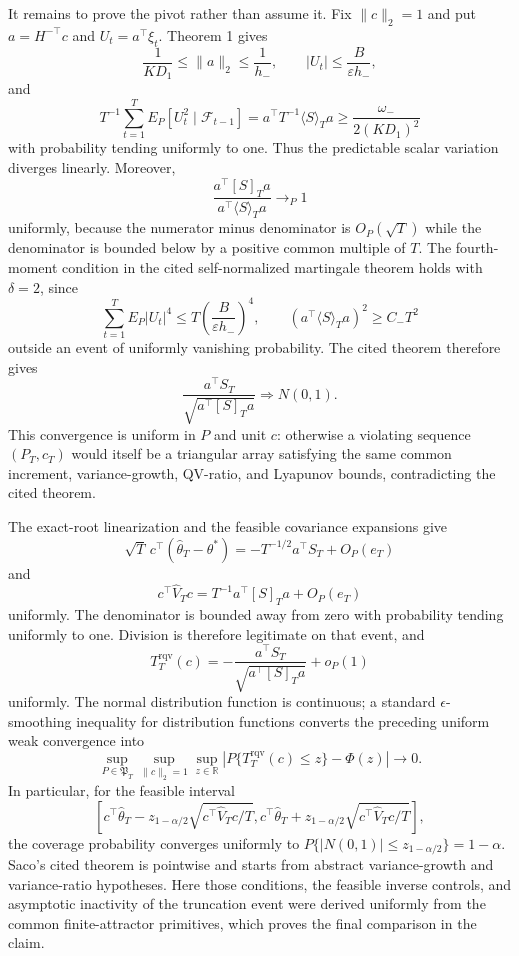 It remains to prove the pivot rather than assume it. Fix \(\|c\|_2=1\) and put \(a=H^{-\top}c\) and \(U_t=a^\top\xi_t\). Theorem 1 gives
\[
 \frac1{KD_1}\le\|a\|_2\le\frac1{h_-},\qquad
 |U_t|\le\frac{B}{\varepsilon h_-},
\]
and
\[
 T^{-1}\sum_{t=1}^TE_P[U_t^2\mid\mathcal F_{t-1}]
 =a^\top T^{-1}\langle S\rangle_Ta
 \ge \frac{\omega_-}{2(KD_1)^2}
\]
with probability tending uniformly to one. Thus the predictable scalar variation diverges linearly. Moreover,
\[
 \frac{a^\top[S]_Ta}{a^\top\langle S\rangle_Ta}\to_P1
\]
uniformly, because the numerator minus denominator is \(O_P(\sqrt T)\) while the denominator is bounded below by a positive common multiple of \(T\). The fourth-moment condition in the cited self-normalized martingale theorem holds with \(\delta=2\), since
\[
 \sum_{t=1}^TE_P|U_t|^4\le T\left(\frac{B}{\varepsilon h_-}\right)^4,
 \qquad
 \left(a^\top\langle S\rangle_Ta\right)^2\ge C_-T^2
\]
outside an event of uniformly vanishing probability. The cited theorem therefore gives
\[
 \frac{a^\top S_T}{\sqrt{a^\top[S]_Ta}}\Rightarrow N(0,1).
\]
This convergence is uniform in \(P\) and unit \(c\): otherwise a violating sequence \((P_T,c_T)\) would itself be a triangular array satisfying the same common increment, variance-growth, QV-ratio, and Lyapunov bounds, contradicting the cited theorem.

The exact-root linearization and the feasible covariance expansions give
\[
 \sqrt T\,c^\top(\widehat\theta_T-\theta^*)
 =-T^{-1/2}a^\top S_T+O_P(e_T)
\]
and
\[
 c^\top\widehat V_Tc
 =T^{-1}a^\top[S]_Ta+O_P(e_T)
\]
uniformly. The denominator is bounded away from zero with probability tending uniformly to one. Division is therefore legitimate on that event, and
\[
 T_T^{\mathrm{rqv}}(c)
 =-\frac{a^\top S_T}{\sqrt{a^\top[S]_Ta}}+o_P(1)
\]
uniformly. The normal distribution function is continuous; a standard \(\epsilon\)-smoothing inequality for distribution functions converts the preceding uniform weak convergence into
\[
 \sup_{P\in\mathfrak P_T}\sup_{\|c\|_2=1}\sup_{z\in\mathbb R}
 \left|P\{T_T^{\mathrm{rqv}}(c)\le z\}-\Phi(z)\right|\to0.
\]
In particular, for the feasible interval
\[
 \left[c^\top\widehat\theta_T-z_{1-\alpha/2}\sqrt{c^\top\widehat V_Tc/T},
 c^\top\widehat\theta_T+z_{1-\alpha/2}\sqrt{c^\top\widehat V_Tc/T}\right],
\]
the coverage probability converges uniformly to \(P\{|N(0,1)|\le z_{1-\alpha/2}\}=1-\alpha\). Saco's cited theorem is pointwise and starts from abstract variance-growth and variance-ratio hypotheses. Here those conditions, the feasible inverse controls, and asymptotic inactivity of the truncation event were derived uniformly from the common finite-attractor primitives, which proves the final comparison in the claim.
